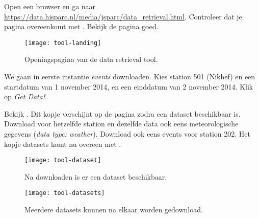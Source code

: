 \begin{questions}
\begin{savenotes}
\end{savenotes}

\question Open een browser en ga naar
\url{https://data.hisparc.nl/media/jsparc/data_retrieval.html}.  Controleer
dat je pagina overeenkomt met .  Bekijk de pagina
goed.

\begin{figure}
  \centering
  \texttt{[image: tool-landing]}
  \caption{Openingspagina van de data retrieval tool.}
  \label{fig:tool-landing}
\end{figure}


\question We gaan in eerste instantie \emph{events} downloaden.  Kies
station 501 (Nikhef) en een startdatum van 1 november 2014, en een
einddatum van 2 november 2014. Klik op \emph{Get Data!}.


\question Bekijk . Dit kopje verschijnt op de
pagina zodra een dataset beschikbaar is. Download voor hetzelfde station
en dezelfde data ook eens meteorologische gegevens (\emph{data type:
weather}).  Download ook eens events voor station 202. Het kopje datasets
komt nu overeen met .

\begin{figure}
  \centering
  \texttt{[image: tool-dataset]}
  \caption{Na downloaden is er een dataset beschikbaar.}
  \label{fig:tool-dataset}
\end{figure}

\begin{figure}
  \centering
  \texttt{[image: tool-datasets]}
  \caption{Meerdere datasets kunnen na elkaar worden gedownload.}
  \label{fig:tool-datasets}
\end{figure}


\end{questions}
